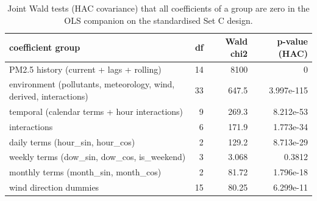 \begin{table}[t]
\centering
\small
\caption{Joint Wald tests (HAC covariance) that all coefficients of a group are zero in the OLS companion on the standardised Set C design.}
\label{tab:table_S09_group_wald_tests}
\begin{tabular}{lrrr}
\toprule
coefficient group & df & Wald chi2 & p-value (HAC) \\
\midrule
PM2.5 history (current + lags + rolling) & 14 & 8100 & 0 \\
environment (pollutants, meteorology, wind, derived, interactions) & 33 & 647.5 & 3.997e-115 \\
temporal (calendar terms + hour interactions) & 9 & 269.3 & 8.212e-53 \\
interactions & 6 & 171.9 & 1.773e-34 \\
  daily terms (hour\_sin, hour\_cos) & 2 & 129.2 & 8.713e-29 \\
  weekly terms (dow\_sin, dow\_cos, is\_weekend) & 3 & 3.068 & 0.3812 \\
  monthly terms (month\_sin, month\_cos) & 2 & 81.72 & 1.796e-18 \\
wind direction dummies & 15 & 80.25 & 6.299e-11 \\
\bottomrule
\end{tabular}
\end{table}
